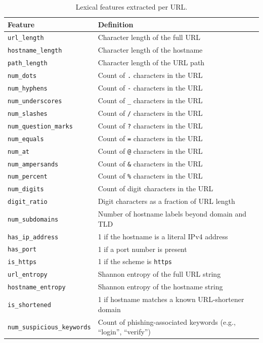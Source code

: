 \documentclass[10pt, a4paper, oneside]{article}
\begin{document}
\begin{table}[htbp]
\centering
\footnotesize
\caption{Lexical features extracted per URL.}
\label{tab:features}
\begin{tabular}{ll}
\toprule
Feature & Definition \\
\midrule
\texttt{url\_length} & Character length of the full URL \\
\texttt{hostname\_length} & Character length of the hostname \\
\texttt{path\_length} & Character length of the URL path \\
\texttt{num\_dots} & Count of \texttt{.} characters in the URL \\
\texttt{num\_hyphens} & Count of \texttt{-} characters in the URL \\
\texttt{num\_underscores} & Count of \texttt{\_} characters in the URL \\
\texttt{num\_slashes} & Count of \texttt{/} characters in the URL \\
\texttt{num\_question\_marks} & Count of \texttt{?} characters in the URL \\
\texttt{num\_equals} & Count of \texttt{=} characters in the URL \\
\texttt{num\_at} & Count of \texttt{@} characters in the URL \\
\texttt{num\_ampersands} & Count of \texttt{\&} characters in the URL \\
\texttt{num\_percent} & Count of \texttt{\%} characters in the URL \\
\texttt{num\_digits} & Count of digit characters in the URL \\
\texttt{digit\_ratio} & Digit characters as a fraction of URL length \\
\texttt{num\_subdomains} & Number of hostname labels beyond domain and TLD \\
\texttt{has\_ip\_address} & 1 if the hostname is a literal IPv4 address \\
\texttt{has\_port} & 1 if a port number is present \\
\texttt{is\_https} & 1 if the scheme is \texttt{https} \\
\texttt{url\_entropy} & Shannon entropy of the full URL string \\
\texttt{hostname\_entropy} & Shannon entropy of the hostname string \\
\texttt{is\_shortened} & 1 if hostname matches a known URL-shortener domain \\
\texttt{num\_suspicious\_keywords} & Count of phishing-associated keywords (e.g., ``login'', ``verify'') \\

\end{tabular}
\end{table}
\end{document}
